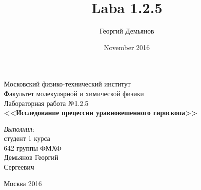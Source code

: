 \documentclass[a4paper,12pt]{article}
\title{Laba 1.2.5}
\author{Георгий Демьянов}
\date{November 2016}
\theoremstyle{plain} %
\theoremstyle{definition} %
\theoremstyle{remark} %
\begin{document}
 

\renewcommand{\figurename}{\textbf{Рис.}}		%
\renewcommand{\tablename}{\textbf{Таблица}}		%

\begin{titlepage}
\begin{center} 
 
\large Московский физико-технический институт\\
Факультет молекулярной и химической физики\\
\vspace{7cm}
\huge Лабораторная работа №1.2.5\\
\textbf{\Large <<Исследование прецессии уравновешенного гироскопа>>}\\
\end{center} 

\vspace{7.5cm}
{\par \raggedleft \large \emph{Выполнил:}\\ студент 1 курса\\ 642 группы ФМХФ\\ Демьянов Георгий\\ Сергеевич \par}
\begin{center}
\vfill Москва 2016
\end{center}
\end{titlepage}

\newpage
\setcounter{page}{2}

\end{document}
